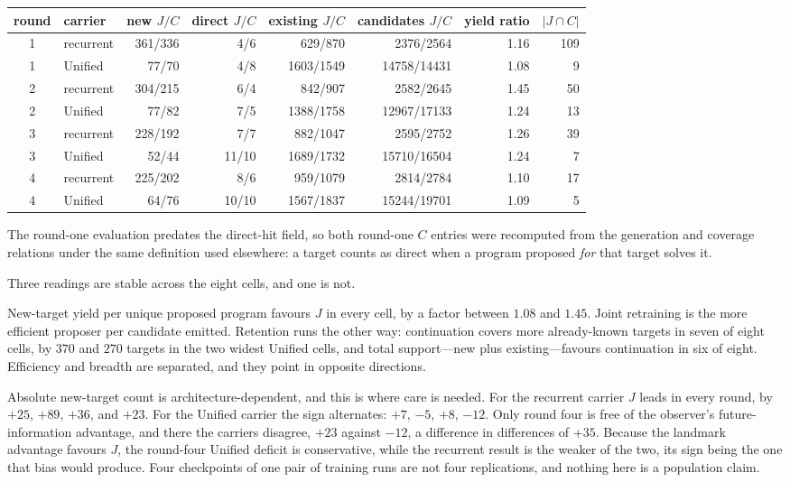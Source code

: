 \documentclass[11pt]{article}
\begin{document}
\begin{center}\small
\begin{tabular}{@{}clrrrrrr@{}}
\toprule
round & carrier & new $J/C$ & direct $J/C$ & existing $J/C$ & candidates $J/C$
 & yield ratio & $|J\cap C|$ \\
\midrule
1 & recurrent & 361/336 & 4/6 & 629/870 & 2376/2564 & 1.16 & 109 \\
1 & Unified & 77/70 & 4/8 & 1603/1549 & 14758/14431 & 1.08 & 9 \\
\midrule
2 & recurrent & 304/215 & 6/4 & 842/907 & 2582/2645 & 1.45 & 50 \\
2 & Unified & 77/82 & 7/5 & 1388/1758 & 12967/17133 & 1.24 & 13 \\
\midrule
3 & recurrent & 228/192 & 7/7 & 882/1047 & 2595/2752 & 1.26 & 39 \\
3 & Unified & 52/44 & 11/10 & 1689/1732 & 15710/16504 & 1.24 & 7 \\
\midrule
4 & recurrent & 225/202 & 8/6 & 959/1079 & 2814/2784 & 1.10 & 17 \\
4 & Unified & 64/76 & 10/10 & 1567/1837 & 15244/19701 & 1.09 & 5 \\
\bottomrule
\end{tabular}
\end{center}

The round-one evaluation predates the direct-hit field, so both round-one $C$ entries were
recomputed from the generation and coverage relations under the same definition used
elsewhere: a target counts as direct when a program proposed \emph{for} that target solves
it.

Three readings are stable across the eight cells, and one is not.

New-target yield per unique proposed program favours $J$ in every cell, by a factor
between $1.08$ and $1.45$. Joint retraining is the more efficient proposer per candidate
emitted. Retention runs the other way: continuation covers more already-known targets in
seven of eight cells, by $370$ and $270$ targets in the two widest Unified cells, and
total support---new plus existing---favours continuation in six of eight. Efficiency and
breadth are separated, and they point in opposite directions.

Absolute new-target count is architecture-dependent, and this is where care is needed. For
the recurrent carrier $J$ leads in every round, by $+25$, $+89$, $+36$, and $+23$. For the
Unified carrier the sign alternates: $+7$, $-5$, $+8$, $-12$. Only round four is free of
the observer's future-information advantage, and there the carriers disagree, $+23$ against
$-12$, a difference in differences of $+35$. Because the landmark advantage favours $J$,
the round-four Unified deficit is conservative, while the recurrent result is the weaker of
the two, its sign being the one that bias would produce. Four checkpoints of one pair of
training runs are not four replications, and nothing here is a population claim.
\end{document}
